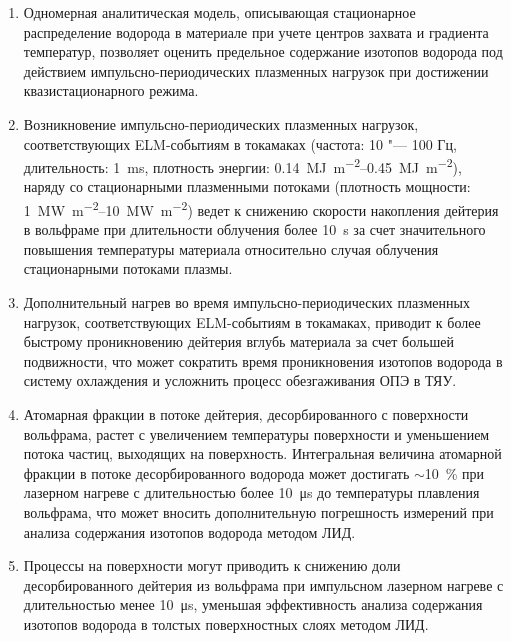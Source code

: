 {}
\begin{enumerate}[beginpenalty=10000] %
    \item Одномерная аналитическая модель, описывающая стационарное распределение водорода в материале при учете центров захвата и градиента температур, позволяет оценить предельное содержание изотопов водорода под действием импульсно-периодических плазменных нагрузок при достижении квазистационарного режима.
    \item Возникновение импульсно-периодических плазменных нагрузок, соответствующих ELM-событиям в токамаках (частота: 10 "--- 100 Гц, длительность: \SI{1}{\milli\second}, плотность энергии: \SIrange{0.14}{0.45}{\mega\joule\per\meter\squared}), наряду со стационарными плазменными потоками (плотность мощности: \SIrange{1}{10}{\mega\watt\per\meter\squared}) ведет к снижению скорости накопления дейтерия в вольфраме при длительности облучения более \SI{10}{\second} за счет значительного повышения температуры материала относительно случая облучения стационарными потоками плазмы. 
    \item Дополнительный нагрев во время импульсно-периодических плазменных нагрузок, соответствующих ELM-событиям в токамаках, приводит к более быстрому проникновению дейтерия вглубь материала за счет большей подвижности, что может сократить время проникновения изотопов водорода в систему охлаждения и усложнить процесс обезгаживания ОПЭ в ТЯУ. 
    \item Атомарная фракции в потоке дейтерия, десорбированного с поверхности вольфрама, растет с увеличением температуры поверхности и уменьшением потока частиц, выходящих на поверхность. Интегральная величина атомарной фракции в потоке десорбированного водорода может достигать $\sim$10~\% при лазерном нагреве с длительностью более \SI{10}{\micro\second} до температуры плавления вольфрама, что может вносить дополнительную погрешность измерений при анализа содержания изотопов водорода методом ЛИД.
    \item Процессы на поверхности могут приводить к снижению доли десорбированного дейтерия из вольфрама при импульсном лазерном нагреве с длительностью менее \SI{10}{\micro\second}, уменьшая эффективность анализа содержания изотопов водорода в толстых поверхностных слоях методом ЛИД.
\end{enumerate}

